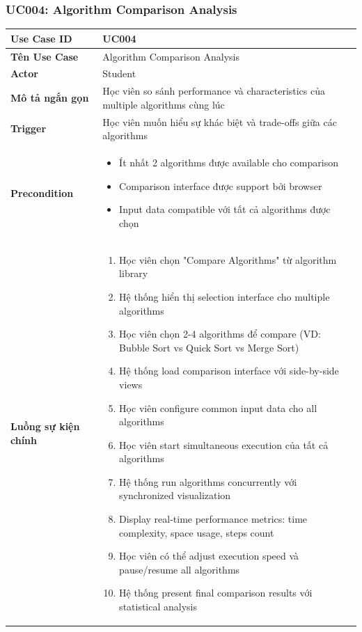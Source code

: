 \subsubsection{UC004: Algorithm Comparison Analysis}

\begin{longtable}{| p{3cm} | p{10cm} |}
\hline
\textbf{Use Case ID} & UC004 \\ \hline
\textbf{Tên Use Case} & Algorithm Comparison Analysis \\ \hline
\textbf{Actor} & Student \\ \hline
\textbf{Mô tả ngắn gọn} & Học viên so sánh performance và characteristics của multiple algorithms cùng lúc \\ \hline
\textbf{Trigger} & Học viên muốn hiểu sự khác biệt và trade-offs giữa các algorithms \\ \hline
\textbf{Precondition} & 
\begin{itemize}
    \item Ít nhất 2 algorithms được available cho comparison
    \item Comparison interface được support bởi browser
    \item Input data compatible với tất cả algorithms được chọn
\end{itemize} \\ \hline
\textbf{Luồng sự kiện chính} & 
\begin{enumerate}
    \item Học viên chọn "Compare Algorithms" từ algorithm library
    \item Hệ thống hiển thị selection interface cho multiple algorithms
    \item Học viên chọn 2-4 algorithms để compare (VD: Bubble Sort vs Quick Sort vs Merge Sort)
    \item Hệ thống load comparison interface với side-by-side views
    \item Học viên configure common input data cho all algorithms
    \item Học viên start simultaneous execution của tất cả algorithms
    \item Hệ thống run algorithms concurrently với synchronized visualization
    \item Display real-time performance metrics: time complexity, space usage, steps count
    \item Học viên có thể adjust execution speed và pause/resume all algorithms
    \item Hệ thống present final comparison results với statistical analysis

\end{enumerate}
\end{longtable}
